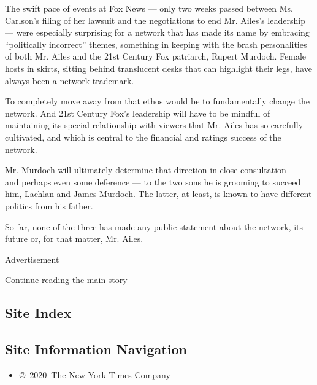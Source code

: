 The swift pace of events at Fox News --- only two weeks passed between
Ms. Carlson's filing of her lawsuit and the negotiations to end Mr.
Ailes's leadership --- were especially surprising for a network that has
made its name by embracing ``politically incorrect'' themes, something
in keeping with the brash personalities of both Mr. Ailes and the 21st
Century Fox patriarch, Rupert Murdoch. Female hosts in skirts, sitting
behind translucent desks that can highlight their legs, have always been
a network trademark.

To completely move away from that ethos would be to fundamentally change
the network. And 21st Century Fox's leadership will have to be mindful
of maintaining its special relationship with viewers that Mr. Ailes has
so carefully cultivated, and which is central to the financial and
ratings success of the network.

Mr. Murdoch will ultimately determine that direction in close
consultation --- and perhaps even some deference --- to the two sons he
is grooming to succeed him, Lachlan and James Murdoch. The latter, at
least, is known to have different politics from his father.

So far, none of the three has made any public statement about the
network, its future or, for that matter, Mr. Ailes.

Advertisement

\protect\hyperlink{after-bottom}{Continue reading the main story}

\hypertarget{site-index}{%
\subsection{Site Index}\label{site-index}}

\hypertarget{site-information-navigation}{%
\subsection{Site Information
Navigation}\label{site-information-navigation}}

\begin{itemize}
\tightlist
\item
  \href{https://help.nytimes3xbfgragh.onion/hc/en-us/articles/115014792127-Copyright-notice}{©~2020~The
  New York Times Company}
\end{itemize}

